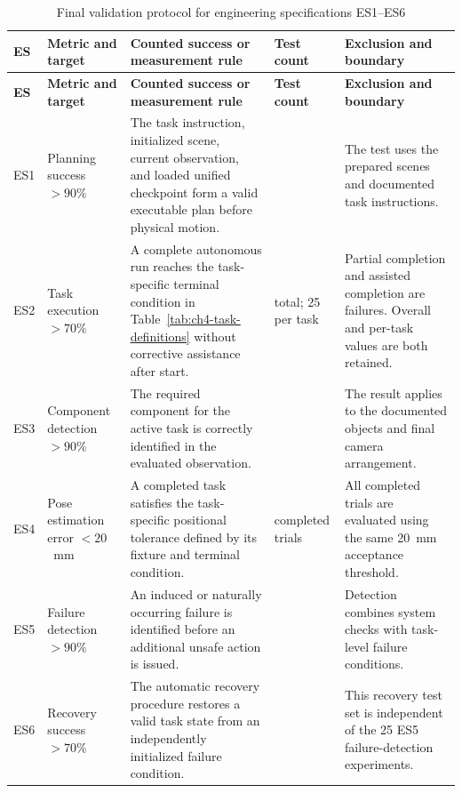 \begingroup
\footnotesize
\setlength{\tabcolsep}{2.5pt}
\renewcommand{\arraystretch}{1.10}
\begin{longtable}{
  >{\centering\arraybackslash}p{}
  >{\raggedright\arraybackslash}p{}
  >{\raggedright\arraybackslash}p{}
  >{\centering\arraybackslash}p{}
  >{\raggedright\arraybackslash}p{}}
  \caption{Final validation protocol for engineering specifications ES1--ES6}
  \label{tab:ch5-es-protocol}\\
  \toprule
  \textbf{ES} & \textbf{Metric and target} & \textbf{Counted success or measurement rule} &
  \textbf{Test count} & \textbf{Exclusion and boundary} \\
  \midrule
  \endfirsthead
  \toprule
  \textbf{ES} & \textbf{Metric and target} & \textbf{Counted success or measurement rule} &
  \textbf{Test count} & \textbf{Exclusion and boundary} \\
  \midrule
  \endhead
  ES1 &
  Planning success \(>90\%\) &
  The task instruction, initialized scene, current observation, and loaded unified checkpoint form a valid executable plan before physical motion. &
  25 &
  The test uses the prepared scenes and documented task instructions. \\
  ES2 &
  Task execution \(>70\%\) &
  A complete autonomous run reaches the task-specific terminal condition in Table~\ref{tab:ch4-task-definitions} without corrective assistance after start. &
  75 total; 25 per task &
  Partial completion and assisted completion are failures. Overall and per-task values are both retained. \\
  ES3 &
  Component detection \(>90\%\) &
  The required component for the active task is correctly identified in the evaluated observation. &
  25 &
  The result applies to the documented objects and final camera arrangement. \\
  ES4 &
  Pose estimation error \(<20\)~mm &
  A completed task satisfies the task-specific positional tolerance defined by its fixture and terminal condition. &
  59 completed trials &
  All completed trials are evaluated using the same 20~mm acceptance threshold. \\
  ES5 &
  Failure detection \(>90\%\) &
  An induced or naturally occurring failure is identified before an additional unsafe action is issued. &
  25 &
  Detection combines system checks with task-level failure conditions. \\
  ES6 &
  Recovery success \(>70\%\) &
  The automatic recovery procedure restores a valid task state from an independently initialized failure condition. &
  25 &
  This recovery test set is independent of the 25 ES5 failure-detection experiments. \\
  \bottomrule
\end{longtable}
\endgroup

